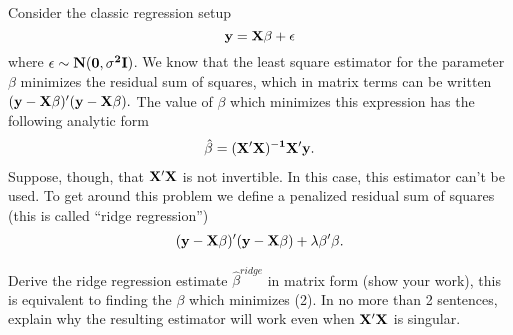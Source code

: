 \documentclass[12pt]{article}
\begin{document}
 {
Consider the classic regression setup
\[\bf{y}=\bf{X}\bf{\beta}+\bf{\epsilon}\]
where $\bf{\epsilon}\sim N(\bf{0},\sigma^2\bf{I})$. We know that the least square estimator for the parameter $\beta$ minimizes the residual sum of squares, which in matrix terms can be written $(\bf{y}-\bf{X}\beta)'(\bf{y}-\bf{X}\beta).$  The value of $\beta$ which minimizes this expression has the following analytic form
\begin{eqnarray}
\hat{\beta}=(\bf{X}'\bf{X})^{-1}\bf{X}'\bf{y}.
\end{eqnarray}
Suppose, though, that $\bf X'X$ is not invertible. In this case, this estimator can't be used.  To get around this problem we define a penalized residual sum of squares (this is called ``ridge regression'')
\begin{eqnarray}
(\bf{y}-\bf{X}\beta)'(\bf{y}-\bf{X}\beta)+\lambda \beta'\beta.
\label{ridge}
\end{eqnarray}


Derive the ridge regression estimate $\hat{\beta}^{ridge}$ in matrix form (show your work), this is equivalent to finding the $\beta$ which minimizes (2).  In no more than 2 sentences, explain why the resulting estimator will work even when  $\bf X'X$ is singular.
}
 { \vfill
  \answer
} {  }
\end{document}
